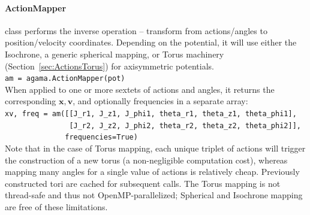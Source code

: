 \documentclass[12pt]{article}
\newcommand{\bv}{\boldsymbol{v}}
\newcommand{\bx}{\boldsymbol{x}}
\begin{document}
\paragraph{ActionMapper} class performs the inverse operation -- transform from actions/angles to position/velocity coordinates. Depending on the potential, it will use either the Isochrone, a generic spherical mapping, or Torus machinery (Section~\ref{sec:ActionsTorus}) for axisymmetric potentials.\\[1mm]
\texttt{am = agama.ActionMapper(pot)}\\[2mm]
When applied to one or more sextets of actions and angles, it returns the corresponding $\bx,\bv$, and optionally frequencies in a separate array:\\[1mm]
\texttt{xv, freq = am([[J_r1, J_z1, J_phi1, theta_r1, theta_z1, theta_phi1],}\\
\texttt{\mbox{}~~~~~~~~~~~~~~~[J_r2, J_z2, J_phi2, theta_r2, theta_z2, theta_phi2]],}\\
\texttt{\mbox{}~~~~~~~~~~~~~~frequencies=True)}\\[1mm]
Note that in the case of Torus mapping, each unique triplet of actions will trigger the construction of a new torus (a non-negligible computation cost), whereas mapping many angles for a single value of actions is relatively cheap. Previously constructed tori are cached for subsequent calls. The Torus mapping is not thread-safe and thus not OpenMP-parallelized; Spherical and Isochrone mapping are free of these limitations.
\end{document}
